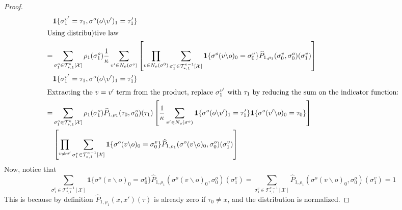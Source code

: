 \documentclass[12pt]{article}
\newcommand{\X}{{\mathcal{X}}}
\newcommand{\TT}{{\mathcal{T}}}
\newcommand{\one}[1]{\mathbf{1}\{#1\}}
\newcommand{\tree}[2]{\TT_{*, #1}^{#2}[\X]}
\numberwithin{equation}{section}
\begin{document}
\begin{proof}
\begin{align*}
          & \one{\sigma^{v'}_1 = \tau_1, \sigma^o(o\backslash v')_1 = \tau_1'}                                                                                                                                                                                                                                                                       \\
        \intertext{Using distribu)tive law}
        = & \sum_{\sigma_1^o\in \tree{1}{\kappa}} \rho_1(\sigma^o_1)  \frac1\kappa \sum_{v'\in N_o(\sigma^o)}\left[\prod_{v\in N_o(\sigma^0)}\sum_{\sigma_1^v\in \tree{1}{\kappa-1}}\one{\sigma^o(v\backslash o)_0 = \sigma^v_0}\widehat{P}_{1, \rho_1}(\sigma^v_0, \sigma^o_0)(\sigma^v_1)\right]                                                   \\
          & \one{\sigma^{v'}_1 = \tau_1, \sigma^o(o\backslash v')_1 = \tau_1'}                                                                                                                                                                                                                                                                       \\
        \intertext{Extracting the $v=v'$ term from the product, replace $\sigma^{v'}_1$ with $\tau_1$ by reducing the sum on the indicator function:}
        = & \sum_{\sigma_1^o\in \tree{1}{\kappa}} \rho_1(\sigma^o_1)\widehat{P}_{1, \rho_1}(\tau_0, \sigma^o_0)(\tau_1) \left[\frac1\kappa \sum_{v'\in N_o(\sigma^o)}\one{\sigma^o(o\backslash v')_1 = \tau_1'}\one{\sigma^o(v'\backslash o)_0 = \tau_0}\right]                                                                                      \\
          & \left[\prod_{v \neq v'}\sum_{\sigma_1^v\in \tree{1}{\kappa-1}}\one{\sigma^o(v\backslash o)_0 = \sigma^v_0}\widehat{P}_{1, \rho_1}(\sigma^o(v\backslash o)_0, \sigma^o_0)(\sigma^v_1)\right]                                                                                                                                              \\
    \end{align*}
    Now, notice that
    \begin{equation*}
        \sum_{\sigma_1^v\in \tree{1}{\kappa-1}}\one{\sigma^o(v\backslash o)_0 = \sigma^v_0}\widehat{P}_{1, \rho_1}(\sigma^o(v\backslash o)_0, \sigma^o_0)(\sigma^v_1)
        = \sum_{\sigma_1^v\in \tree{1}{\kappa-1}}\widehat{P}_{1, \rho_1}(\sigma^o(v\backslash o)_0, \sigma^o_0)(\sigma^v_1) = 1
    \end{equation*}
    This is because by definition $\widehat{P}_{1, \rho_1}(x, x')(\tau)$ is already zero if $\tau_0 \neq x$, and the distribution is normalized.


\end{proof}
\end{document}
